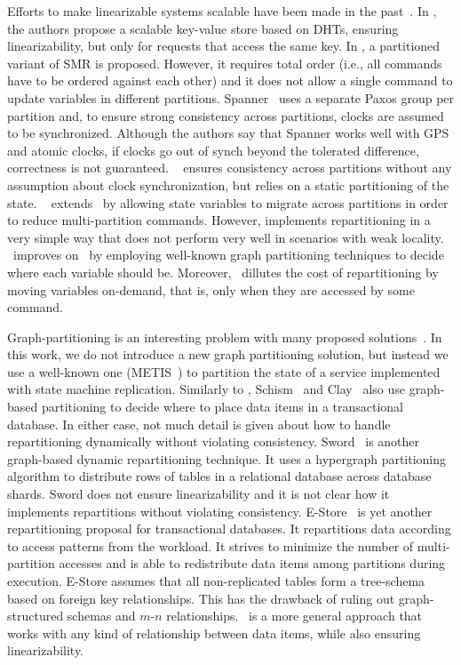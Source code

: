 Efforts to make linearizable systems scalable have been made in the past~\cite{corbett2013spanner, bezerra2014ssmr, hoang2016, Glendenning2011, Marandi11}.
In \cite{Glendenning2011}, the authors propose a scalable key-value store based on DHTs, ensuring linearizability, but only for requests that access the same key. 
In \cite{Marandi11}, a partitioned variant of SMR is proposed.
However, it requires total order (i.e., all commands have to be ordered against each other) and it does not allow a single command to update variables in different partitions.
Spanner~\cite{corbett2013spanner} uses a separate Paxos group per partition and, to ensure strong consistency across partitions, clocks are assumed to be synchronized.
Although the authors say that Spanner works well with GPS and atomic clocks, if clocks go out of synch beyond the tolerated difference, correctness is not guaranteed.
\ssmr{}~\cite{bezerra2014ssmr} ensures consistency across partitions without any assumption about clock synchronization, but relies on a static partitioning of the state.
\dssmr{}~\cite{hoang2016} extends \dssmr\ by allowing state variables to migrate across partitions in order to reduce multi-partition commands.
However, \dssmr{} implements repartitioning in a very simple way that does not perform very well in scenarios with weak locality.
\dynastar\ improves on \dssmr\ by employing well-known graph partitioning techniques to decide where each variable should be.
Moreover, \dynastar\ dillutes the cost of repartitioning by moving variables on-demand, that is, only when they are accessed by some command.

Graph-partitioning is an interesting problem with many proposed solutions~\cite{Abou-Rjeili:2006,kernighan1970efficient,hendrickson2000graph}.
In this work, we do not introduce a new graph partitioning solution, but instead we use a well-known one (METIS~\cite{Abou-Rjeili:2006}) to partition the state of a service implemented with state machine replication.
Similarly to \dynastar{}, Schism~\cite{curino2010sch} and Clay~\cite{SerafiniTEPAS16} also use graph-based partitioning to decide where to place data items in a transactional database.
In either case, not much detail is given about how to handle repartitioning dynamically without violating consistency.
Sword~\cite{quamar2013sword} is another graph-based dynamic repartitioning technique.
It uses a hypergraph partitioning algorithm to distribute rows of tables in a relational database across database shards.
Sword does not ensure linearizability and it is not clear how it implements repartitions without violating consistency.
E-Store~\cite{taft2014est} is yet another repartitioning proposal for transactional databases.
It repartitions data according to access patterns from the workload.
It strives to minimize the number of multi-partition accesses and is able to redistribute data items among partitions during execution.
E-Store assumes that all non-replicated tables form a tree-schema based on foreign key relationships.
This has the drawback of ruling out graph-structured schemas and \mbox{$m$-$n$} relationships.
\dynastar\ is a more general approach that works with any kind of relationship between data items, while also ensuring linearizability.

